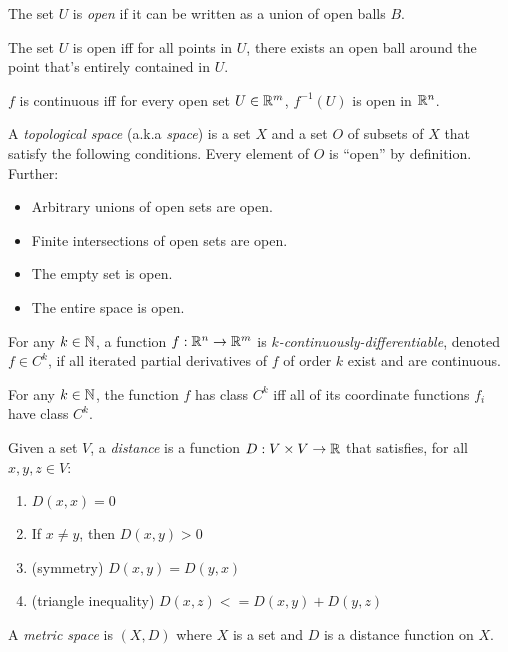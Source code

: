 \documentclass[11pt,leqno,oneside]{amsart}
\begin{document}
\begin{defn}
	The set $U$ is \emph{open} if it can be written as a union of open balls $B$.
\end{defn}
\begin{thm}
	The set $U$ is open iff for all points in $U$, there exists an open ball around the point that's entirely contained in $U$.
\end{thm}
\begin{thm}
	$f$ is continuous iff for every open set $U \in {\mathbb R}^m$, $f^{-1}(U)$ is open in ${\mathbb R}^n$.
\end{thm}
\begin{defn}
	A \emph{topological space} (a.k.a \emph{space}) is a set $X$ and a set $O$ of subsets of $X$ that satisfy the following conditions.  Every element of $O$ is ``open'' by definition.  Further:
	\begin{itemize}
		\item Arbitrary unions of open sets are open.
		\item Finite intersections of open sets are open.
		\item The empty set is open.
		\item The entire space is open.
	\end{itemize}
\end{defn}
\begin{defn}
	For any $k \in {\mathbb N}$, a function $f:{\mathbb R}^n \to {\mathbb R}^m$ is \emph{$k$-continuously-differentiable}, denoted $f \in C^k$, if all iterated partial derivatives of $f$ of order $k$ exist and are continuous.
\end{defn}
\begin{thm}
	For any $k \in {\mathbb N}$, the function $f$ has class $C^k$ iff all of its coordinate functions $f_i$ have class $C^k$.
\end{thm}
\begin{defn}
	Given a set $V$, a \emph{distance} is a function $D : V \times V \to {\mathbb R}$ that satisfies, for all $x, y, z \in V$:
	\begin{enumerate}
		\item $D(x,x) = 0$
		\item If $x \neq y$, then $D(x,y) > 0$
		\item (symmetry) $D(x,y) = D(y,x)$
		\item (triangle inequality) $D(x,z) <= D(x,y) + D(y,z)$
	\end{enumerate}
\end{defn}
\begin{defn}
	A \emph{metric space} is $(X, D)$ where $X$ is a set and $D$ is a distance function on $X$.
\end{defn}
\end{document}
